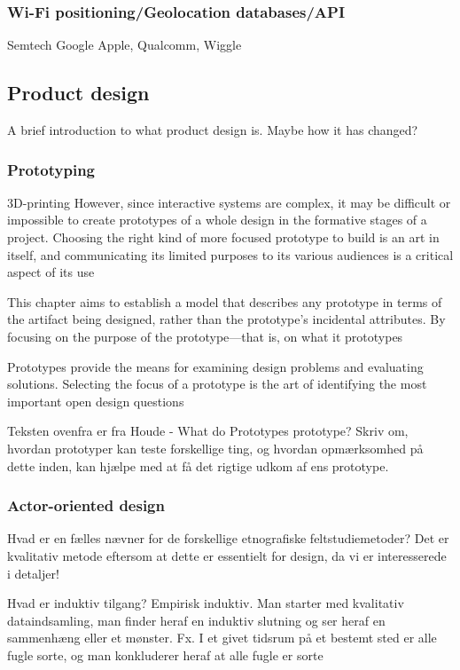 \subsubsection{Wi-Fi positioning/Geolocation databases/API}
Semtech
Google
Apple, Qualcomm, Wiggle

\subsection{Product design}
A brief introduction to what product design is. Maybe how it has changed?

\subsubsection{Prototyping}




3D-printing
However, since interactive systems are complex, it may be difficult or impossible to create prototypes of a whole design in the formative stages of a project.
Choosing the right kind of more focused prototype to build is an art in itself, and communicating its limited purposes to its various audiences is a critical aspect of its use

This chapter aims to establish a model that describes any prototype in terms of the artifact being designed, rather than the prototype's incidental attributes. By focusing on the purpose of the prototype—that is, on what it prototypes

Prototypes provide the means for examining design problems and evaluating solutions. Selecting the focus of a prototype is the art of identifying the most important open design questions

Teksten ovenfra er fra Houde - What do Prototypes prototype?
Skriv om, hvordan prototyper kan teste forskellige ting, og hvordan opmærksomhed på dette inden, kan hjælpe med at få det rigtige udkom af ens prototype.

\subsubsection{Actor-oriented design}
Hvad er en fælles nævner for de forskellige etnografiske feltstudiemetoder?
Det er kvalitativ metode eftersom at dette er essentielt for design, da vi er interesserede i detaljer!

Hvad er induktiv tilgang?
Empirisk induktiv. Man starter med kvalitativ dataindsamling, man finder heraf en induktiv slutning og ser heraf en sammenhæng eller et mønster.
Fx. I et givet tidsrum på et bestemt sted er alle fugle sorte, og man konkluderer heraf at alle fugle er sorte

